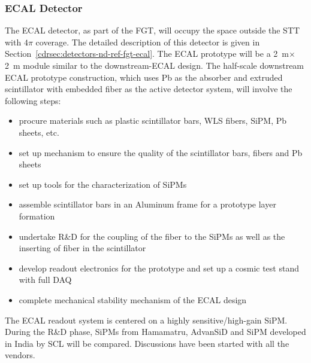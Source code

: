 \subsubsection{ECAL Detector}

The ECAL detector, as part of the FGT,  will occupy the space outside
the STT with $4\pi$ coverage.  The detailed description of this
detector is given in Section~\ref{cdrsec:detectors-nd-ref-fgt-ecal}.
The ECAL prototype will be a 2~m$\times$2~m module similar to the
downstream-ECAL design.  The half-scale downstream ECAL prototype
construction, which uses Pb as the absorber and extruded scintillator
with embedded fiber as the active detector system, will involve the
following steps:
\begin{itemize}
\item procure materials such as plastic scintillator bars, WLS fibers,
  SiPM, Pb sheets, etc.
\item set up mechanism to ensure the quality of the scintillator bars,
  fibers and Pb sheets
\item set up tools for the characterization of SiPMs
\item assemble scintillator bars in an Aluminum frame for a
  prototype layer formation
\item undertake R\&D for the coupling of the fiber to the SiPMs as well
  as the inserting of fiber in the scintillator
\item develop readout electronics for the prototype and set up a cosmic
  test stand with full DAQ
\item complete mechanical stability mechanism of the ECAL design 
\end{itemize}

The ECAL readout system is centered on a highly sensitive/high-gain SiPM. %
During the R\&D phase, SiPMs from Hamamatru, AdvanSiD and SiPM developed in India by SCL will be compared. 
Discussions have been started with all the vendors.


